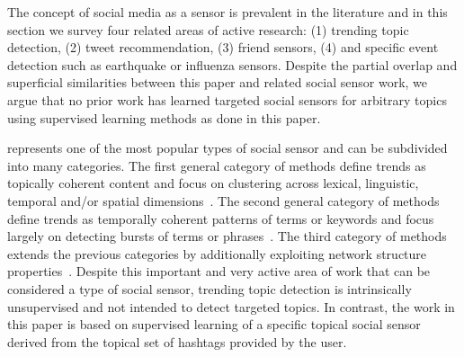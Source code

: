 %
%
%
%
%

The concept of social media as a sensor is prevalent in the literature
and in this section we survey four related areas of active research:
(1) trending topic detection, (2) tweet recommendation, (3) friend
sensors, (4) and specific event detection such as earthquake or
influenza sensors.  Despite the partial overlap and superficial
similarities between this paper and related social sensor work, we
argue that no prior work has learned targeted social sensors for
arbitrary topics using supervised learning methods as done in this
paper.

\vspace{2mm}
 represents one of the most popular
types of social sensor and can be subdivided into many categories.  The
first general category of methods define trends as topically coherent
content and focus on clustering across lexical, linguistic, temporal
and/or spatial
dimensions~\cite{petrovic,ishikawa,murata,becker,tweetmotif,wangLee}.
The second general category of methods define trends as temporally
coherent patterns of terms or keywords and focus largely on detecting
bursts of terms or
phrases~\cite{mathioudakis,cuiZhang,zhaoSports,nichols,aiello}.
%
The third category of methods extends the previous categories by
additionally exploiting network structure properties~\cite{budak}.
Despite this important and very active area of work that can be
considered a type of social sensor, trending topic detection is
intrinsically unsupervised and not intended to detect targeted topics.
In contrast, the work in this paper is based on supervised learning of
a specific topical social sensor derived from the topical set of
hashtags provided by the user.

